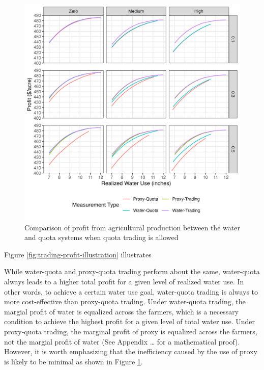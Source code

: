 \documentclass[
]{article}
\begin{document}
\begin{figure}[H]

{\centering \includegraphics{figures/g_trade_effect_profit} 

}

\caption{Comparison of profit from agricultural production between the water and quota systems when quota trading is allowed}\label{fig:trading-profit}
\end{figure}

Figure \ref{fig:trading-profit-illustration} illustrates

While water-quota and proxy-quota trading perform about the same, water-quota always leads to a higher total profit for a given level of realized water use. In other words, to achieve a certain water use goal, water-quota trading is always to more cost-effective than proxy-quota trading. Under water-quota trading, the margial profit of water is equalized across the farmers, which is a necessary condition to achieve the highest profit for a given level of total water use. Under proxy-quota trading, the marginal profit of proxy is equalized across the farmers, not the margial profit of water (See Appendix \ldots{} for a mathematical proof). However, it is worth emphasizing that the inefficiency caused by the use of proxy is likely to be minimal as shown in Figure \ref{fig:trading-profit}.
\end{document}
